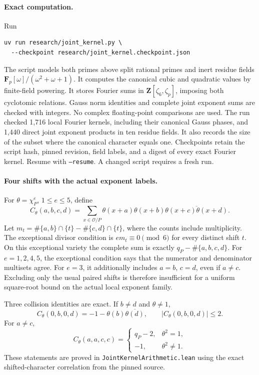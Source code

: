 \documentclass[11pt]{article}
\newcommand{\OO}{\mathcal O}
\begin{document}
\paragraph{Exact computation.}
Run
\begin{verbatim}
uv run research/joint_kernel.py \
  --checkpoint research/joint_kernel.checkpoint.json
\end{verbatim}
The script models both primes above split rational primes and inert
residue fields \(\mathbf F_p[\omega]/(\omega^2+\omega+1)\).
It computes the canonical cubic and quadratic values by finite-field
powering. It stores Fourier sums in
\(\mathbf Z[\zeta_6,\zeta_p]\), imposing both cyclotomic relations.
Gauss norm identities and complete joint exponent sums are checked
with integers. No complex floating-point comparisons are used.
The run checked 1,716 local Fourier kernels, including their canonical
Gauss phases, and 1,440 direct joint exponent products in ten residue
fields. It also records the size of the subset where the canonical
character equals one.
Checkpoints retain the script hash, pinned revision, field labels,
and a digest of every exact Fourier kernel.
Resume with \texttt{--resume}. A changed script requires a fresh run.

\paragraph{Four shifts with the actual exponent labels.}
For \(\theta=\chi_P^e\), \(1\le e\le5\), define
\[
 C_\theta(a,b,c,d)=\sum_{x\in\OO/P}
 \theta(x+a)\theta(x+b)\overline{\theta(x+c)\theta(x+d)}.
\]
Let \(m_t=\#\{a,b\}\cap\{t\}-\#\{c,d\}\cap\{t\}\), where
the counts include multiplicity. The exceptional divisor condition is
\(e m_t\equiv0\pmod6\) for every distinct shift \(t\).
On this exceptional variety the complete sum is exactly
\(q_P-\#\{a,b,c,d\}\).
For \(e=1,2,4,5\), the exceptional condition says that the numerator
and denominator multisets agree. For \(e=3\), it additionally includes
\(a=b\), \(c=d\), even if \(a\ne c\).
Excluding only the usual paired shifts is therefore insufficient for
a uniform square-root bound on the actual local exponent family.

Three collision identities are exact. If \(b\ne d\) and
\(\theta\ne1\),
\[
 C_\theta(0,b,0,d)=-1-\theta(b)\overline{\theta(d)},
 \qquad |C_\theta(0,b,0,d)|\le2.
\]
For \(a\ne c\),
\[
 C_\theta(a,a,c,c)=
 \begin{cases}q_P-2,&\theta^2=1,\\-1,&\theta^2\ne1.\end{cases}
\]
These statements are proved in \texttt{JointKernelArithmetic.lean}
using the exact shifted-character correlation from the pinned source.
\end{document}
